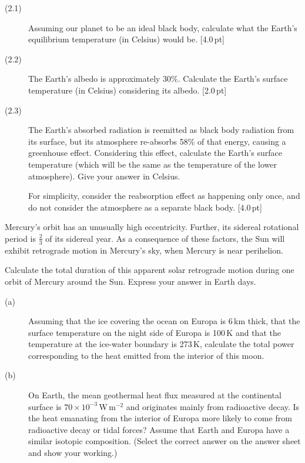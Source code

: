 \begin{description}
\item[(2.1)] Assuming our planet to be an ideal black body, calculate what
  the Earth's equilibrium temperature (in Celsius) would be.
  \hfill[4.0\,pt]
\item[(2.2)] The Earth's albedo is approximately 30\%. Calculate the Earth's
  surface temperature (in Celsius) considering its albedo. \hfill[2.0\,pt]
\item[(2.3)] The Earth's absorbed radiation is reemitted as black body
  radiation from its surface, but its atmosphere re-absorbs 58\% of that
  energy, causing a greenhouse effect. Considering this effect, calculate the
  Earth's surface temperature (which will be the same as the temperature of
  the lower atmosphere). Give your answer in Celsius.

  For simplicity, consider the reabsorption effect as happening only once,
  and do not consider the atmosphere as a separate black body.
  \hfill[4.0\,pt]
\end{description}

Mercury's orbit has an unusually high eccentricity. Further, its sidereal
rotational period is $\frac{2}{3}$ of its sidereal year. As a consequence of
these factors, the Sun will exhibit retrograde motion in Mercury's sky, when
Mercury is near perihelion.

Calculate the total duration of this apparent solar retrograde motion during
one orbit of Mercury around the Sun. Express your answer in Earth days.

\begin{description}
\item[(a)] Assuming that the ice covering the ocean on Europa is 6\,km thick,
  that the surface temperature on the night side of Europa is 100\,K and that
  the temperature at the ice-water boundary is 273\,K, calculate the total
  power corresponding to the heat emitted from the interior of this moon.
\item[(b)] On Earth, the mean geothermal heat flux measured at the
  continental surface is $70 \times 10^{-3}$\,W\,m$^{-2}$ and originates
  mainly from radioactive decay. Is the heat emanating from the interior of
  Europa more likely to come from radioactive decay or tidal forces? Assume
  that Earth and Europa have a similar isotopic composition. (Select the
  correct answer on the answer sheet and show your working.)
\end{description}

